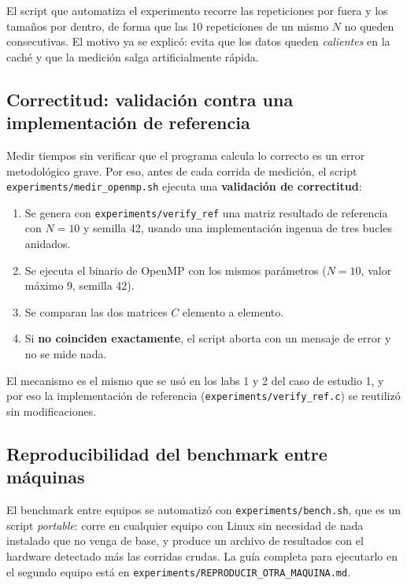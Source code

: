 El script que automatiza el experimento recorre las repeticiones por fuera y los tamaños por dentro, de forma que las 10 repeticiones de un mismo $N$ no queden consecutivas. El motivo ya se explicó: evita que los datos queden \textit{calientes} en la caché y que la medición salga artificialmente rápida.

\subsection{Correctitud: validación contra una implementación de referencia}

Medir tiempos sin verificar que el programa calcula lo correcto es un error metodológico grave. Por eso, antes de cada corrida de medición, el script \texttt{experiments/medir\_openmp.sh} ejecuta una \textbf{validación de correctitud}:

\begin{enumerate}
    \item Se genera con \texttt{experiments/verify\_ref} una matriz resultado de referencia con $N=10$ y semilla 42, usando una implementación ingenua de tres bucles anidados.
    \item Se ejecuta el binario de OpenMP con los mismos parámetros ($N=10$, valor máximo 9, semilla 42).
    \item Se comparan las dos matrices $C$ elemento a elemento.
    \item Si \textbf{no coinciden exactamente}, el script aborta con un mensaje de error y no se mide nada.
\end{enumerate}

El mecanismo es el mismo que se usó en los labs 1 y 2 del caso de estudio 1, y por eso la implementación de referencia (\texttt{experiments/verify\_ref.c}) se reutilizó sin modificaciones.

\subsection{Reproducibilidad del benchmark entre máquinas}

El benchmark entre equipos se automatizó con \texttt{experiments/bench.sh}, que es un script \emph{portable}: corre en cualquier equipo con Linux sin necesidad de nada instalado que no venga de base, y produce un archivo de resultados con el hardware detectado más las corridas crudas. La guía completa para ejecutarlo en el segundo equipo está en \texttt{experiments/REPRODUCIR\_OTRA\_MAQUINA.md}.

